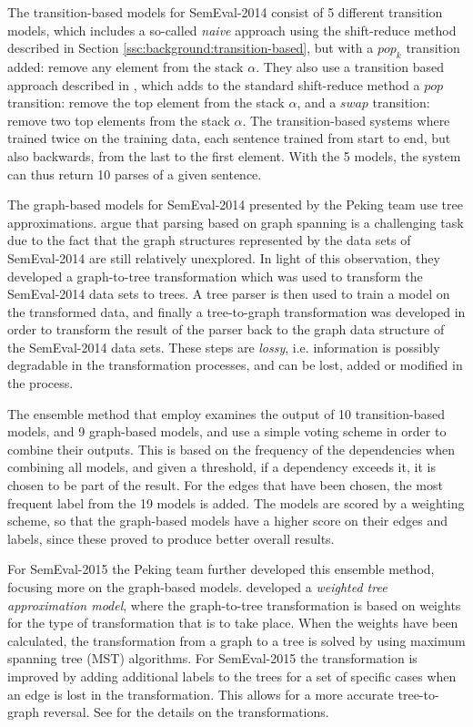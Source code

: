 The transition-based models for SemEval-2014 consist of 5 different transition models, which includes a so-called \textit{naive} approach using the shift-reduce method described in Section \ref{ssc:background:transition-based}, but with a $pop_k$ transition added: remove any element from the stack $\alpha$. They also use a transition based approach described in \cite{Titov:09}, which adds to the standard shift-reduce method a $pop$ transition: remove the top element from the stack $\alpha$, and a $swap$ transition: remove two top elements from the stack $\alpha$. The transition-based systems where trained twice on the training data, each sentence trained from start to end, but also backwards, from the last to the first element. With the 5 models, the system can thus return 10 parses of a given sentence.

The graph-based models for SemEval-2014 presented by the Peking team use tree approximations.  argue that parsing based on graph spanning is a challenging task due to the fact that the graph structures represented by the data sets of SemEval-2014 are still relatively unexplored. In light of this observation, they developed a graph-to-tree transformation which was used to transform the SemEval-2014 data sets to trees. A tree parser is then used to train a model on the transformed data, and finally a tree-to-graph transformation was developed in order to transform the result of the parser back to the graph data structure of the SemEval-2014 data sets. These steps are \textit{lossy}, i.e. information is possibly degradable in the transformation processes, and can be lost, added or modified in the process.

The ensemble method that  employ examines the output of 10 transition-based models, and 9 graph-based models, and use a simple voting scheme in order to combine their outputs. This is based on the frequency of the dependencies when combining all models, and given a threshold, if a dependency exceeds it, it is chosen to be part of the result. For the edges that have been chosen, the most frequent label from the 19 models is added. The models are scored by a weighting scheme, so that the graph-based models have a higher score on their edges and labels, since these proved to produce better overall results.

For SemEval-2015 the Peking team further developed this ensemble method, focusing more on the graph-based models.  developed a \textit{weighted tree approximation model}, where the graph-to-tree transformation is based on weights for the type of transformation that is to take place. When the weights have been calculated, the transformation from a graph to a tree is solved by using maximum spanning tree (MST) algorithms. For SemEval-2015 the transformation is improved by adding additional labels to the trees for a set of specific cases when an edge is lost in the transformation. This allows for a more accurate tree-to-graph reversal. See \cite{Du:Peking:15} for the details on the transformations.


